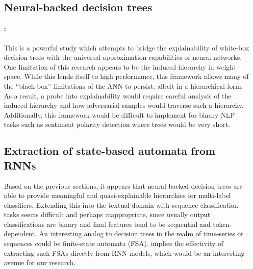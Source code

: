 \subsection{Neural-backed decision trees}

\paragraph{\citealt{wan2020nbdt}:} This is a powerful study which attempts to bridge the explainability of white-box decision trees with the universal approximation capabilities of neural networks. One limitation of this research appears to be the induced hierarchy in weight space. While this lends itself to high performance, this framework allows many of the ``black-box'' limitations of the ANN to persist; albeit in a hierarchical form. As a result, a probe into explainability would require careful analysis of the induced hierarchy and how adversarial samples would traverse such a hierarchy. Additionally, this framework would be difficult to implement for binary NLP tasks such as sentiment polarity detection where trees would be very short.

\subsection{Extraction of state-based automata from RNNs}

Based on the previous sections, it appears that neural-backed decision trees are able to provide meaningful and quasi-explainable hierarchies for multi-label classifiers. Extending this into the textual domain with sequence classification tasks seems difficult and perhaps inappropriate, since usually output classifications are binary and final features tend to be sequential and token-dependent. An interesting analog to decision trees in the realm of time-series or sequences could be finite-state automata (FSA). \citet{hou2018learning} implies the effectivity of extracting such FSAs directly from RNN models, which would be an interesting avenue for our research.


